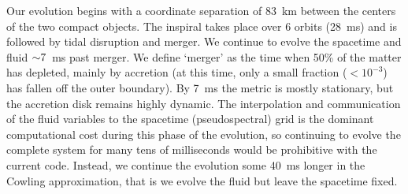 Our evolution begins with a coordinate separation of 83~km
between the centers of the two compact objects.
The inspiral takes place over 6 orbits (28~ms) and is followed by tidal disruption and merger.
We continue to evolve the spacetime and fluid $\mathord{\sim}7$~ms past merger.
We define `merger' as the time when 50\% of the matter has
depleted, mainly by accretion (at this time, only a small fraction
($<10^{-3}$) has fallen off the outer boundary).
By 7~ms the metric is mostly stationary, but the accretion disk remains
highly dynamic.  The interpolation and communication of the fluid variables
to the spacetime (pseudospectral) grid is the dominant
computational cost during this phase of the evolution,
so continuing to evolve the complete system for many tens of
milliseconds would be prohibitive with the current code.  Instead,
we continue the evolution some 40~ms longer in
the Cowling approximation, that is we evolve the fluid but leave
the spacetime fixed.

